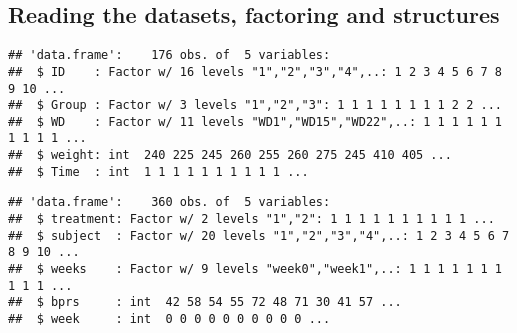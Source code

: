 \documentclass[]{article}
\newenvironment{Shaded}{\begin{snugshade}}{\end{snugshade}}
\newcommand{\KeywordTok}[1]{\textcolor[rgb]{0.13,0.29,0.53}{\textbf{#1}}}
\newcommand{\DataTypeTok}[1]{\textcolor[rgb]{0.13,0.29,0.53}{#1}}
\newcommand{\StringTok}[1]{\textcolor[rgb]{0.31,0.60,0.02}{#1}}
\newcommand{\OperatorTok}[1]{\textcolor[rgb]{0.81,0.36,0.00}{\textbf{#1}}}
\newcommand{\NormalTok}[1]{#1}
\begin{document}
\subsection{Reading the datasets, factoring and
structures}\label{reading-the-datasets-factoring-and-structures}

\begin{Shaded}
\end{Shaded}

\begin{verbatim}
## 'data.frame':    176 obs. of  5 variables:
##  $ ID    : Factor w/ 16 levels "1","2","3","4",..: 1 2 3 4 5 6 7 8 9 10 ...
##  $ Group : Factor w/ 3 levels "1","2","3": 1 1 1 1 1 1 1 1 2 2 ...
##  $ WD    : Factor w/ 11 levels "WD1","WD15","WD22",..: 1 1 1 1 1 1 1 1 1 1 ...
##  $ weight: int  240 225 245 260 255 260 275 245 410 405 ...
##  $ Time  : int  1 1 1 1 1 1 1 1 1 1 ...
\end{verbatim}

\begin{Shaded}
\end{Shaded}

\begin{verbatim}
## 'data.frame':    360 obs. of  5 variables:
##  $ treatment: Factor w/ 2 levels "1","2": 1 1 1 1 1 1 1 1 1 1 ...
##  $ subject  : Factor w/ 20 levels "1","2","3","4",..: 1 2 3 4 5 6 7 8 9 10 ...
##  $ weeks    : Factor w/ 9 levels "week0","week1",..: 1 1 1 1 1 1 1 1 1 1 ...
##  $ bprs     : int  42 58 54 55 72 48 71 30 41 57 ...
##  $ week     : int  0 0 0 0 0 0 0 0 0 0 ...
\end{verbatim}
\end{document}
